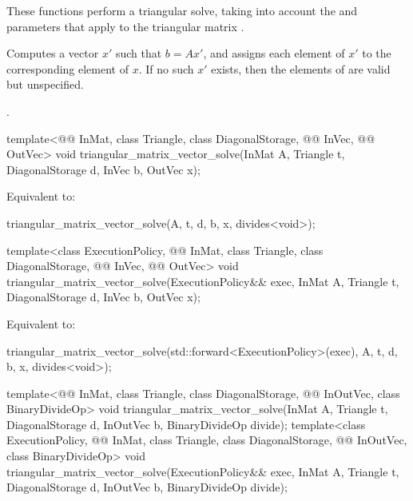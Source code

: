 \begin{itemdescr}

\pnum
These functions perform
a triangular solve,
taking into account the  and  parameters
that apply to the triangular matrix .

\pnum
\effects
Computes a vector $x'$ such that $b = A x'$,
and assigns each element of $x'$ to the corresponding element of $x$.
If no such $x'$ exists,
then the elements of  are valid but unspecified.

\pnum
\complexity
{}.
\end{itemdescr}

\begin{itemdecl}
template<@@ InMat, class Triangle, class DiagonalStorage,
         @@ InVec, @@ OutVec>
  void triangular_matrix_vector_solve(InMat A, Triangle t, DiagonalStorage d, InVec b, OutVec x);
\end{itemdecl}

\begin{itemdescr}
\pnum
\effects
Equivalent to:
\begin{codeblock}
triangular_matrix_vector_solve(A, t, d, b, x, divides<void>{});
\end{codeblock}
\end{itemdescr}

\begin{itemdecl}
template<class ExecutionPolicy, @@ InMat, class Triangle, class DiagonalStorage,
         @@ InVec, @@ OutVec>
  void triangular_matrix_vector_solve(ExecutionPolicy&& exec,
                                      InMat A, Triangle t, DiagonalStorage d, InVec b, OutVec x);
\end{itemdecl}

\begin{itemdescr}
\pnum
\effects
Equivalent to:
\begin{codeblock}
triangular_matrix_vector_solve(std::forward<ExecutionPolicy>(exec),
                               A, t, d, b, x, divides<void>{});
\end{codeblock}
\end{itemdescr}

\begin{itemdecl}
template<@@ InMat, class Triangle, class DiagonalStorage,
         @@ InOutVec, class BinaryDivideOp>
  void triangular_matrix_vector_solve(InMat A, Triangle t, DiagonalStorage d,
                                      InOutVec b, BinaryDivideOp divide);
template<class ExecutionPolicy, @@ InMat, class Triangle, class DiagonalStorage,
         @@ InOutVec, class BinaryDivideOp>
  void triangular_matrix_vector_solve(ExecutionPolicy&& exec,
                                      InMat A, Triangle t, DiagonalStorage d,
                                      InOutVec b, BinaryDivideOp divide);
\end{itemdecl}


